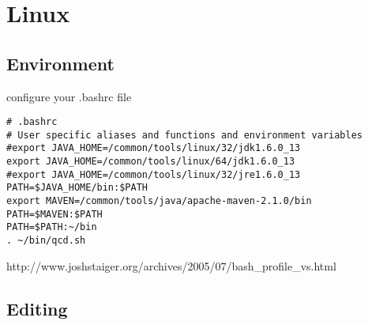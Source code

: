 \chapter{Linux}
\section{Environment}
configure your .bashrc file 

\begin{verbatim}
# .bashrc
# User specific aliases and functions and environment variables
#export JAVA_HOME=/common/tools/linux/32/jdk1.6.0_13
export JAVA_HOME=/common/tools/linux/64/jdk1.6.0_13
#export JAVA_HOME=/common/tools/linux/32/jre1.6.0_13
PATH=$JAVA_HOME/bin:$PATH
export MAVEN=/common/tools/java/apache-maven-2.1.0/bin
PATH=$MAVEN:$PATH
PATH=$PATH:~/bin
. ~/bin/qcd.sh

\end{verbatim}
http://www.joshstaiger.org/archives/2005/07/bash_profile_vs.html
\section{Editing}